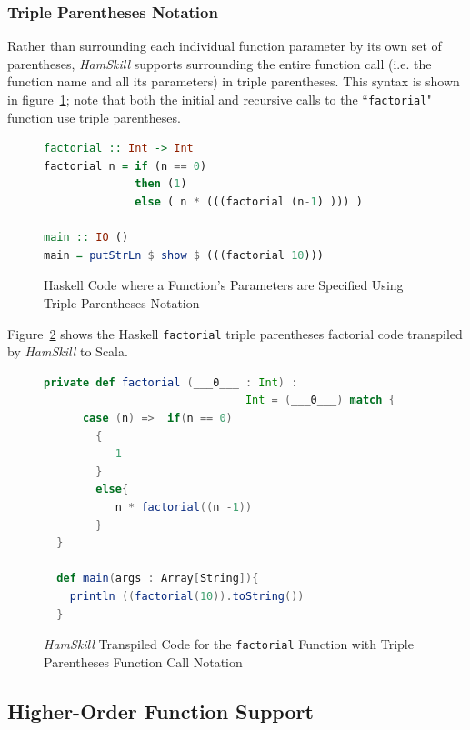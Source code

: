 \documentclass{report}
\begin{document}
\subsubsection{Triple Parentheses Notation}

Rather than surrounding each individual function parameter by its own set of parentheses, \textit{HamSkill} supports surrounding the entire function call (i.e. the function name and all its parameters) in triple parentheses.  This syntax is shown in figure~\ref{fig:haskellFunctionFactorial}; note that both the initial and recursive calls to the ``\texttt{factorial}" function use triple parentheses.

\begin{figure}[H]
\begin{mdframed}
\begin{lstlisting}[language=Haskell]
factorial :: Int -> Int
factorial n = if (n == 0)
              then (1)
              else ( n * (((factorial (n-1) ))) )

main :: IO ()
main = putStrLn $ show $ (((factorial 10)))
\end{lstlisting}
\end{mdframed}
\caption{Haskell Code where a Function's Parameters are Specified Using Triple Parentheses Notation}\label{fig:haskellFunctionFactorial}
\end{figure}

Figure~\ref{fig:scalaFunctionFactorial} shows the Haskell \texttt{factorial} triple parentheses factorial code transpiled by \textit{HamSkill} to Scala.

\begin{figure}[H]
\begin{mdframed}
\begin{lstlisting}[language=Scala]
  private def factorial (___0___ : Int) :
                               Int = (___0___) match {
      case (n) =>  if(n == 0)
        {
           1
        }
        else{
           n * factorial((n -1))
        }
  } 
  
  def main(args : Array[String]){
    println ((factorial(10)).toString())
  } 
\end{lstlisting}
\end{mdframed}
\caption{\textit{HamSkill} Transpiled Code for the \texttt{factorial} Function with Triple Parentheses Function Call Notation}\label{fig:scalaFunctionFactorial}
\end{figure}

\subsection{Higher-Order Function Support}\label{sec:higherOrderFunctions}
\end{document}
